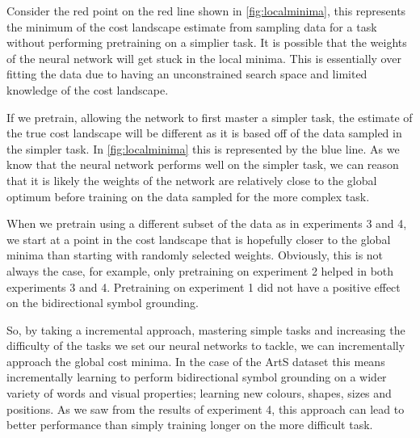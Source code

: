 Consider the red point on the red line shown in \autoref{fig:localminima}, this represents the minimum of the cost landscape estimate from sampling data for a task without performing pretraining on a simplier task. It is possible that the weights of the neural network will get stuck in the local minima. This is essentially over fitting the data due to having an unconstrained search space and limited knowledge of the cost landscape.

If we pretrain, allowing the network to first master a simpler task, the estimate of the true cost landscape will be different as it is based off of the data sampled in the simpler task. In \autoref{fig:localminima} this is represented by the blue line. As we know that the neural network performs well on the simpler task, we can reason that it is likely the weights of the network are relatively close to the global optimum before training on the data sampled for the more complex task.


When we pretrain using a different subset of the data as in experiments 3 and 4, we start at a point in the cost landscape that is hopefully closer to the global minima than starting with randomly selected weights. Obviously, this is not always the case, for example, only pretraining on experiment 2 helped in both experiments 3 and 4. Pretraining on experiment 1 did not have a positive effect on the bidirectional symbol grounding.

So, by taking a incremental approach, mastering simple tasks and increasing the difficulty of the tasks we set our neural networks to tackle, we can incrementally approach the global cost minima. In the case of the ArtS dataset this means incrementally learning to perform bidirectional symbol grounding on a wider variety of words and visual properties; learning new colours, shapes, sizes and positions. As we saw from the results of experiment 4, this approach can lead to better performance than simply training longer on the more difficult task.


\theendnotes
